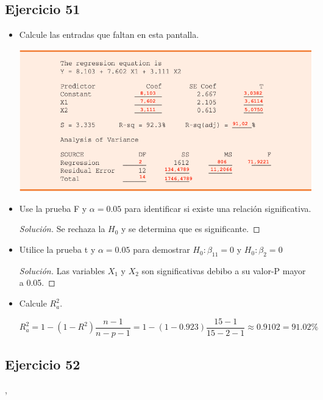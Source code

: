 \documentclass[a4paper,12pt]{article}
\newenvironment{solution}
  {\renewcommand\qedsymbol{$\blacksquare$}\begin{proof}[Solución]}
  {\end{proof}}
\begin{document}
\subsection{Ejercicio 51}
\begin{itemize}
   \item  Calcule las entradas que faltan en esta pantalla.
    \begin{center}
        \includegraphics[scale=0.5]{Imagenes/50-51.png}
    \end{center}
   \item Use la prueba F y $\alpha= 0.05$ para identificar si existe una relación significativa.
   \begin{solution}
   Se rechaza la $H_0$ y se determina que es significante.
   \end{solution}
   
   \item  Utilice la prueba t y $\alpha =0.05$ para demostrar $H_0: \beta_11=0$ y $H_0:\beta_2=0$
   \begin{solution}
   Las variables $X_1$ y $X_2$ son significativas debibo a su valor-P mayor a 0.05. 
   \end{solution}
  
   \item Calcule $R^2_a$.
   
   $$
R_{a}^{2}=1-\left(1-R^{2}\right) \frac{n-1}{n-p-1}=1-(1-0.923) \frac{15-1}{15-2-1} \approx 0.9102=91.02 \%
$$
   
\end{itemize}


\subsection{Ejercicio 52},
\end{document}
